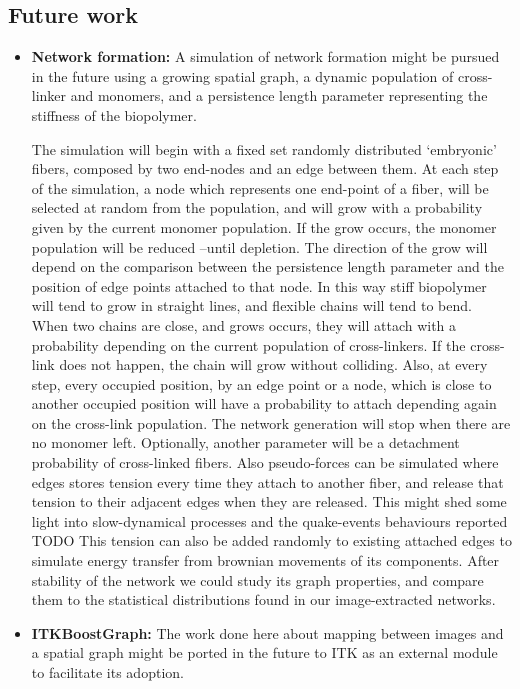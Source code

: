 \subsection{Future work}%
\label{sub:future_work}

\begin{itemize}[topsep=0pt]
  \item \textbf{Network formation:} A simulation of network formation might be pursued in the future
    using a growing spatial graph, a dynamic population of cross-linker and monomers, and a persistence length parameter representing the stiffness of the biopolymer.

    The simulation will begin with a fixed set randomly distributed `embryonic' fibers, composed by two end-nodes and an edge between them. At each step of the simulation, a node which represents one end-point of a fiber, will be selected at random from the population, and will grow with a probability given by the current monomer population. If the grow occurs, the monomer population will be reduced --until depletion. The direction of the grow will depend on the comparison between the persistence length parameter and the position of edge points attached to that node. In this way stiff biopolymer will tend to grow in straight lines, and flexible chains will tend to bend.
    When two chains are close, and grows occurs, they will attach with a probability depending on the current population of cross-linkers. If the cross-link does not happen, the chain will grow without colliding. Also, at every step, every occupied position, by an edge point or a node, which is close to another occupied position will have a probability to attach depending again on the cross-link population. The network generation will stop when there are no monomer left. Optionally, another parameter will be a detachment probability of cross-linked fibers. Also pseudo-forces can be simulated where edges stores tension every time they attach to another fiber, and release that tension to their adjacent edges when they are released. This might shed some light into slow-dynamical processes and the quake-events behaviours reported TODO  This tension can also be added randomly to existing attached edges to simulate energy transfer from brownian movements of its components. After stability of the network we could study its graph properties, and compare them to the statistical distributions found in our image-extracted networks.

  \item \textbf{ITKBoostGraph: } The work done here about mapping between images and a spatial graph might be ported in the future to ITK as an external module to facilitate its adoption.


\end{itemize}

